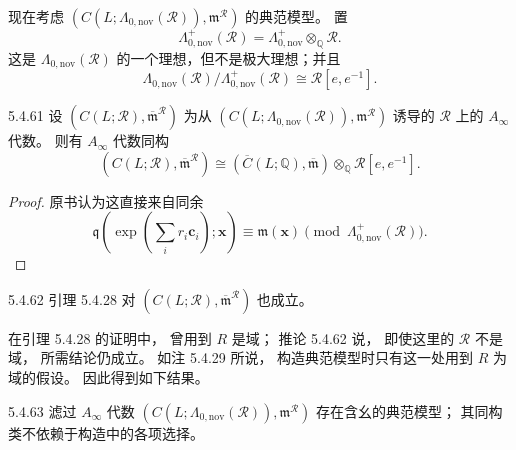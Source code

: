 现在考虑
$(C(L;\Lambda_{0,\mathrm{nov}}(\mathcal R)),
\mathfrak m^{\mathcal R})$
的典范模型。
置
\[
\Lambda^+_{0,\mathrm{nov}}(\mathcal R)
=\Lambda^+_{0,\mathrm{nov}}\otimes_{\mathbb Q}\mathcal R.
\]
这是
$\Lambda_{0,\mathrm{nov}}(\mathcal R)$
的一个理想，但不是极大理想；并且
\[
\Lambda_{0,\mathrm{nov}}(\mathcal R)
/\Lambda^+_{0,\mathrm{nov}}(\mathcal R)
\cong\mathcal R[e,e^{-1}].
\]

\begin{lemma}{5.4.61}\label{lem:5-4-61}
设
$(C(L;\mathcal R),
\overline{\mathfrak m}^{\mathcal R})$
为从
$(C(L;\Lambda_{0,\mathrm{nov}}(\mathcal R)),
\mathfrak m^{\mathcal R})$
诱导的 $\mathcal R$ 上的 $A_\infty$ 代数。
则有 $A_\infty$ 代数同构
\[
(C(L;\mathcal R),
\overline{\mathfrak m}^{\mathcal R})
\cong
(\overline C(L;\mathbb Q),\overline{\mathfrak m})
\otimes_{\mathbb Q}\mathcal R[e,e^{-1}].
\]
\end{lemma}
\begin{proof}
原书认为这直接来自同余
\[
\mathfrak q\left(
\exp\left(\sum_i r_i\mathbf c_i\right);
\mathbf x
\right)
\equiv\mathfrak m(\mathbf x)
\pmod{\Lambda^+_{0,\mathrm{nov}}(\mathcal R)}.
\]
\end{proof}

\begin{corollary}{5.4.62}\label{cor:5-4-62}
引理 5.4.28 对
$(C(L;\mathcal R),
\overline{\mathfrak m}^{\mathcal R})$
也成立。
\end{corollary}
在引理 5.4.28 的证明中，
曾用到 $R$ 是域；
推论 5.4.62 说，
即使这里的 $\mathcal R$ 不是域，
所需结论仍成立。
如注 5.4.29 所说，
构造典范模型时只有这一处用到
$R$ 为域的假设。
因此得到如下结果。

\begin{proposition}{5.4.63}\label{prop:5-4-63}
滤过 $A_\infty$ 代数
$(C(L;\Lambda_{0,\mathrm{nov}}(\mathcal R)),
\mathfrak m^{\mathcal R})$
存在含幺的典范模型；
其同构类不依赖于构造中的各项选择。
\end{proposition}

